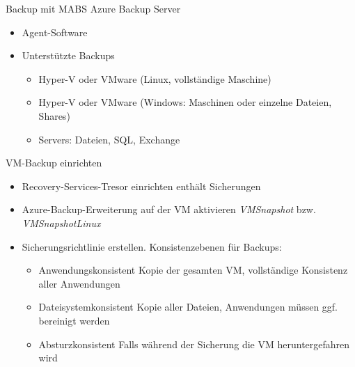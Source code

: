 \begin{flashcard}[Definition]{Backup mit MABS}
    Azure Backup Server
    \begin{itemize}
        \item Agent-Software
        \item Unterstützte Backups
            \begin{itemize}
                \item Hyper-V oder VMware (Linux, vollständige Maschine)
                \item Hyper-V oder VMware (Windows: Maschinen oder einzelne Dateien, Shares)
                \item Servers: Dateien, SQL, Exchange
            \end{itemize}
    \end{itemize}
\end{flashcard}


\begin{flashcard}[Definition]{VM-Backup einrichten}
    \begin{itemize}
        \item Recovery-Services-Tresor einrichten\newline
            enthält Sicherungen
        \item Azure-Backup-Erweiterung auf der VM aktivieren\newline
            \emph{VMSnapshot} bzw. \emph{VMSnapshotLinux}
        \item Sicherungsrichtlinie erstellen. Konsistenzebenen für Backups:
            \begin{itemize}
             \item Anwendungskonsistent\newline
                Kopie der gesamten VM, vollständige Konsistenz aller Anwendungen
             \item Dateisystemkonsistent\newline
                Kopie aller Dateien, Anwendungen müssen ggf. bereinigt werden
             \item Absturzkonsistent\newline
                Falls während der Sicherung die VM heruntergefahren wird
            \end{itemize}

    \end{itemize}
\end{flashcard}

